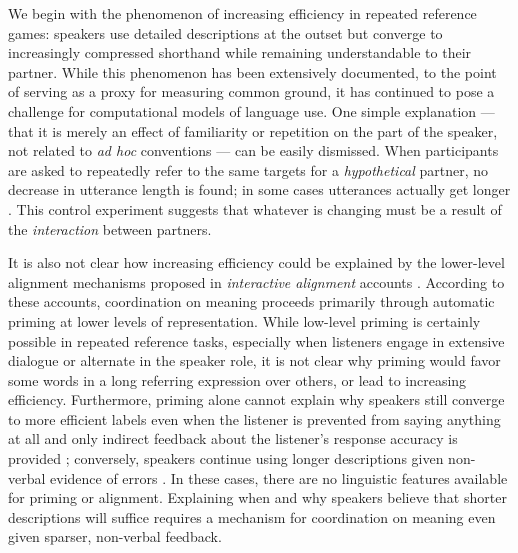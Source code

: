 

We begin with the phenomenon of increasing efficiency in repeated reference games: speakers use detailed descriptions at the outset but converge to increasingly compressed shorthand while remaining understandable to their partner.
While this phenomenon has been extensively documented, to the point of serving as a proxy for measuring common ground, it has continued to pose a challenge for computational models of language use.
One simple explanation --- that it is merely an effect of familiarity or repetition on the part of the speaker, not related to \emph{ad hoc} conventions --- can be easily dismissed. 
When participants are asked to repeatedly refer to the same targets for a \emph{hypothetical} partner, no decrease in utterance length is found; in some cases utterances actually get longer \cite{HupetChantraine92_CollaborationOrRepitition}. 
This control experiment suggests that whatever is changing must be a result of the \emph{interaction} between partners.

It is also not clear how increasing efficiency could be explained by the lower-level alignment mechanisms proposed in \emph{interactive alignment} accounts \cite{pickering2004toward, pickering2006alignment, garrod2009joint}.
According to these accounts, coordination on meaning proceeds primarily through automatic priming at lower levels of representation.
While low-level priming is certainly possible in repeated reference tasks, especially when listeners engage in extensive dialogue or alternate in the speaker role, it is not clear why priming would favor some words in a long referring expression over others, or lead to increasing efficiency.
Furthermore, priming alone cannot explain why speakers still converge to more efficient labels even when the listener is prevented from saying anything at all and only indirect feedback about the listener's response accuracy is provided \cite{KraussWeinheimer66_Tangrams}; conversely, speakers continue using longer descriptions given non-verbal evidence of errors \cite{hawkins2020characterizing}.
In these cases, there are no linguistic features available for priming or alignment.
Explaining when and why speakers believe that shorter descriptions will suffice requires a mechanism for coordination on meaning even given sparser, non-verbal feedback.


